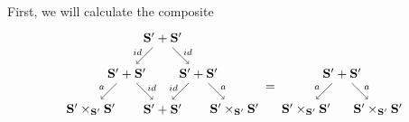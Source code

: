 \documentclass[11pt]{amsart}
\newcommand{\cat}[1]{\mathbf{#1}}
\theoremstyle{remark}
\theoremstyle{definition}
\begin{document}
First, we will calculate the composite
\[
\begin{tikzpicture}
	\begin{scope}
	\node (v1) at (0,2) {$\cat{S}'+ \cat{S}'$};
	\node (v2) at (-1,1) {$\cat{S}' \times_{\cat{S}'} \cat{S}'$};
	\node (v3) at (1,1) {$\cat{S}'+ \cat{S}'$};
	\node (v4) at (2,2) {$\cat{S}'+ \cat{S}'$};
	\node (v5) at (3,1) {$\cat{S}' \times_{\cat{S}'} \cat{S}'$};
	\node (v6) at (1,3) {$\cat{S}'+ \cat{S}'$};
	\draw [->] (v1) to node[shift={(-0.2,0.1)}] {\scriptsize $a$} (v2);
	\draw [->] (v1) to node[shift={(0.2,0.1)}] {\scriptsize $id$} (v3);
	\draw [->]  (v4) edge node[shift={(-0.2,0.1)}] {\scriptsize $id$} (v3);
	\draw [->] (v4) edge node[shift={(0.2,0.1)}] {\scriptsize $a$} (v5);
	\draw [->]  (v6) edge node[shift={(-0.2,0.1)}] {\scriptsize $id$} (v1);
	\draw [->] (v6) edge node[shift={(0.2,0.1)}] {\scriptsize $id$} (v4);
	\end{scope}
	\begin{scope}[shift={(6,0)}]
	\node (v1) at (0,2) {$\cat{S}'+ \cat{S}'$};
	\node (v2) at (-1,1) {$\cat{S}' \times_{\cat{S}'} \cat{S}'$};
	\node (v3) at (1,1) {$\cat{S}' \times_{\cat{S}'} \cat{S}'$};
	\draw [->] (v1) to node [shift={(-0.2,0.1)}] {\scriptsize $a$} (v2);
	\draw [->] (v1) to node [shift={(0.2,0.1)}] {\scriptsize $a$} (v3);
	\end{scope}
	\node at (4,1.6) {$=$};
\end{tikzpicture}
\]
\end{document}
